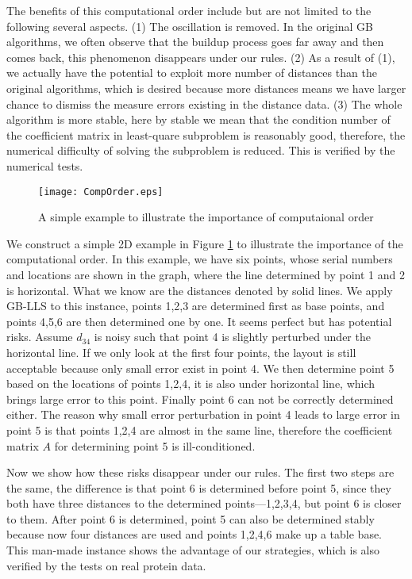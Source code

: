 \documentclass[a4paper,12pt]{article}
\begin{document}
The benefits of this computational order include but are not limited to the following several aspects. (1) The oscillation is removed. In the original GB algorithms, we often observe that the buildup process goes far away and then comes back, this phenomenon disappears under our rules. (2) As a result of (1), we actually have the potential to exploit more number of distances than the original algorithms, which is desired because more distances means we have larger chance to dismiss the measure errors existing in the distance data. (3) The whole algorithm is more stable, here by stable we mean that the condition number of the coefficient matrix in least-quare subproblem is reasonably good, therefore, the numerical difficulty of solving the subproblem is reduced. This is verified by the numerical tests.

\begin{figure}[htp]
  \centering
  \texttt{[image: CompOrder.eps]}\\
  \caption{A simple example to illustrate the importance of computaional order}\label{fig:CompOrder}
\end{figure}

We construct a simple 2D example in Figure \ref{fig:CompOrder} to illustrate the importance of the computational order. In this example, we have six points, whose serial numbers and locations are shown in the graph, where the line determined by point 1 and 2 is horizontal. What we know are the distances denoted by solid lines. We apply GB-LLS to this instance, points 1,2,3 are determined first as base points, and points 4,5,6 are then determined one by one. It seems perfect but has potential risks. Assume $d_{34}$ is noisy such that point 4 is slightly perturbed under the horizontal line. If we only look at the first four points, the layout is still acceptable because only small error exist in point 4. We then determine point 5 based on the locations of points 1,2,4, it is also under horizontal line, which brings large error to this point. Finally point 6 can not be correctly determined either. The reason why small error perturbation in point 4 leads to large error in point 5 is that points 1,2,4 are almost in the same line, therefore the coefficient matrix $A$ for determining point 5 is ill-conditioned.

Now we show how these risks disappear under our rules. The first two steps are the same, the difference is that point 6 is determined before point 5, since they both have three distances to the determined points---1,2,3,4, but point 6 is closer to them. After point 6 is determined, point 5 can also be determined stably because now four distances are used and points 1,2,4,6 make up a table base. This man-made instance shows the advantage of our strategies, which is also verified by the tests on real protein data.
\end{document}
